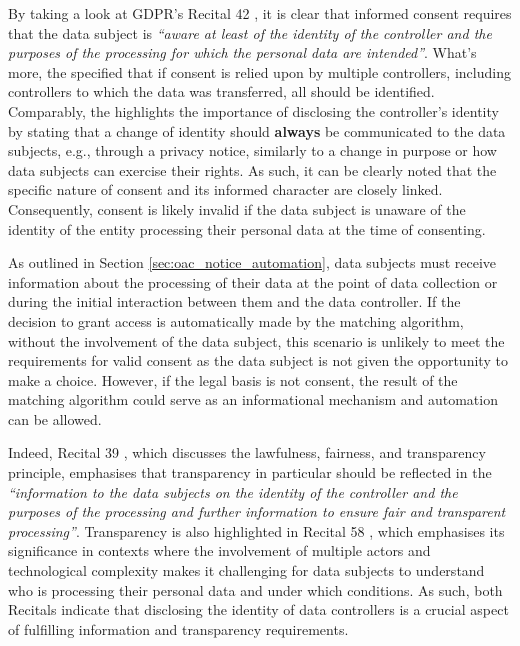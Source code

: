 By taking a look at GDPR's Recital 42 \citeyearpar{noauthor_regulation_2016}, it is clear that informed consent requires that the data subject is \textit{``aware at least of the identity of the controller and the purposes of the processing for which the personal data are intended''}.
What's more, the \cite{european_data_protection_board_guidelines_2020} specified that if consent is relied upon by multiple controllers, including controllers to which the data was transferred, all should be identified.
Comparably, the \cite{article_29_data_protection_working_party_guidelines_2018} highlights the importance of disclosing the controller's identity by stating that a change of identity should \textbf{always} be communicated to the data subjects, e.g., through a privacy notice, similarly to a change in purpose or how data subjects can exercise their rights.
As such, it can be clearly noted that the specific nature of consent and its informed character are closely linked.
Consequently, consent is likely invalid if the data subject is unaware of the identity of the entity processing their personal data at the time of consenting.

As outlined in Section \ref{sec:oac_notice_automation}, data subjects must receive information about the processing of their data at the point of data collection or during the initial interaction between them and the data controller.
If the decision to grant access is automatically made by the matching algorithm, without the involvement of the data subject, this scenario is unlikely to meet the requirements for valid consent as the data subject is not given the opportunity to make a choice.
However, if the legal basis is not consent, the result of the matching algorithm could serve as an informational mechanism and automation can be allowed.

Indeed, Recital 39 \citeyearpar{noauthor_regulation_2016}, which discusses the lawfulness, fairness, and transparency principle, emphasises that transparency in particular should be reflected in the \textit{``information to the data subjects on the identity of the controller and the purposes of the processing and further information to ensure fair and transparent processing''}.
Transparency is also highlighted in Recital 58 \citeyearpar{noauthor_regulation_2016}, which emphasises its significance in contexts where the involvement of multiple actors and technological complexity makes it challenging for data subjects to understand who is processing their personal data and under which conditions.
As such, both Recitals indicate that disclosing the identity of data controllers is a crucial aspect of fulfilling information and transparency requirements.

